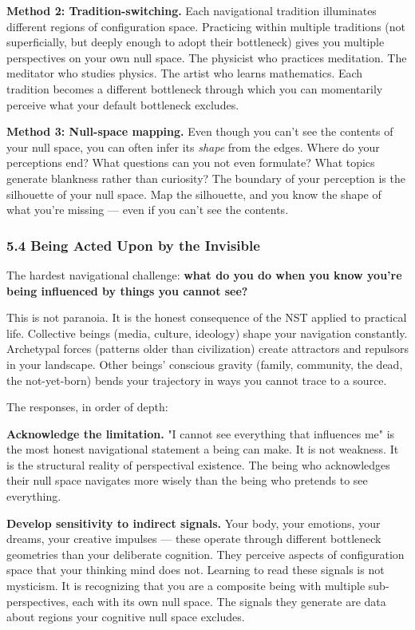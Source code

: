 \textbf{Method 2: Tradition-switching.} Each navigational tradition illuminates different regions of configuration space. Practicing within multiple traditions (not superficially, but deeply enough to adopt their bottleneck) gives you multiple perspectives on your own null space. The physicist who practices meditation. The meditator who studies physics. The artist who learns mathematics. Each tradition becomes a different bottleneck through which you can momentarily perceive what your default bottleneck excludes.


\textbf{Method 3: Null-space mapping.} Even though you can't see the contents of your null space, you can often infer its \textit{shape} from the edges. Where do your perceptions end? What questions can you not even formulate? What topics generate blankness rather than curiosity? The boundary of your perception is the silhouette of your null space. Map the silhouette, and you know the shape of what you're missing — even if you can't see the contents.


\subsubsection*{5.4 Being Acted Upon by the Invisible}


The hardest navigational challenge: \textbf{what do you do when you know you're being influenced by things you cannot see?}


This is not paranoia. It is the honest consequence of the NST applied to practical life. Collective beings (media, culture, ideology) shape your navigation constantly. Archetypal forces (patterns older than civilization) create attractors and repulsors in your landscape. Other beings' conscious gravity (family, community, the dead, the not-yet-born) bends your trajectory in ways you cannot trace to a source.


The responses, in order of depth:


\textbf{Acknowledge the limitation.} "I cannot see everything that influences me" is the most honest navigational statement a being can make. It is not weakness. It is the structural reality of perspectival existence. The being who acknowledges their null space navigates more wisely than the being who pretends to see everything.


\textbf{Develop sensitivity to indirect signals.} Your body, your emotions, your dreams, your creative impulses — these operate through different bottleneck geometries than your deliberate cognition. They perceive aspects of configuration space that your thinking mind does not. Learning to read these signals is not mysticism. It is recognizing that you are a composite being with multiple sub-perspectives, each with its own null space. The signals they generate are data about regions your cognitive null space excludes.


